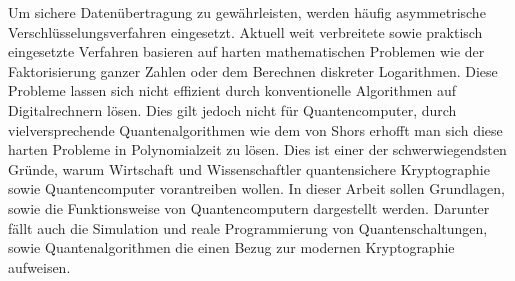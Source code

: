 Um sichere Daten\"ubertragung zu gew\"ahrleisten, werden h\"aufig asymmetrische Verschl\"usselungsverfahren eingesetzt. Aktuell weit verbreitete sowie praktisch eingesetzte Verfahren basieren auf harten mathematischen Problemen wie der Faktorisierung ganzer Zahlen oder dem Berechnen diskreter Logarithmen. Diese Probleme lassen sich nicht effizient durch konventionelle Algorithmen auf Digitalrechnern l\"osen. Dies gilt jedoch nicht f\"ur Quantencomputer, durch vielversprechende Quantenalgorithmen wie dem von Shors erhofft man sich diese harten Probleme in Polynomialzeit zu l\"osen. Dies ist einer der schwerwiegendsten Gr\"unde, warum Wirtschaft und Wissenschaftler quantensichere Kryptographie sowie Quantencomputer vorantreiben wollen. In dieser Arbeit sollen Grundlagen, sowie die Funktionsweise von Quantencomputern dargestellt werden. Darunter f\"allt auch die Simulation und reale Programmierung von Quantenschaltungen, sowie Quantenalgorithmen die einen Bezug zur modernen Kryptographie aufweisen.
